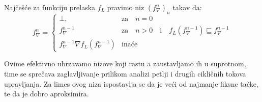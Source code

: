 Najčešće za funkciju prelaska $f_{L}$ pravimo niz $(f^{n}_{\nabla})_{n}$ takav da:
$$
f^{n}_{\nabla} = 
\begin{cases}
\bot,            								  & 	\text{za} \quad n = 0 \\
f^{n-1}_{\nabla} 							      & \text{za} \quad n > 0 \quad \text{i} \quad f_{L}(f^{n-1}_{\nabla}) \sqsubseteq f^{n-1}_{\nabla} \\
f^{n-1}_{\nabla} \nabla f_{L}(f^{n-1}_{\nabla})  & \text{inače}
\end{cases}
$$

Ovime efektivno ubrzavamo nizove koji rastu a zaustavljamo ih u suprotnom, time se sprečava zaglavljivanje prilikom analizi petlji i drugih cikličnih tokova upravljanja. Za limes ovog niza ispostavlja se da je veći od najmanje fiksne tačke, te da je dobro aproksimira. 